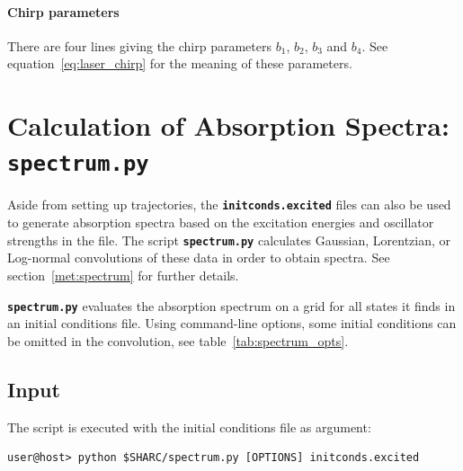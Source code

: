\documentclass[a4paper,10pt,DIV=15,openany,twoside=false]{scrbook}
\newcommand{\ttt}[1]{\textbf{\texttt{#1}}}
\begin{document}
\paragraph{Chirp parameters}

There are four lines giving the chirp parameters $b_1$, $b_2$, $b_3$ and $b_4$. See equation~\eqref{eq:laser_chirp} for the meaning of these parameters.








\section{Calculation of Absorption Spectra: \ttt{spectrum.py}}\label{sec:spectrum.py}

Aside from setting up trajectories, the \ttt{initconds.excited} files can also be used to generate absorption spectra based on the excitation energies and oscillator strengths in the file. The script \ttt{spectrum.py} calculates Gaussian, Lorentzian, or Log-normal convolutions of these data in order to obtain spectra. See section~\ref{met:spectrum} for further details.

\ttt{spectrum.py} evaluates the absorption spectrum on a grid for all states it finds in an initial conditions file. Using command-line options, some initial conditions can be omitted in the convolution, see table~\ref{tab:spectrum_opts}.

\subsection{Input}

The script is executed with the initial conditions file as argument:
\begin{verbatim}
user@host> python $SHARC/spectrum.py [OPTIONS] initconds.excited
\end{verbatim}
\end{document}
